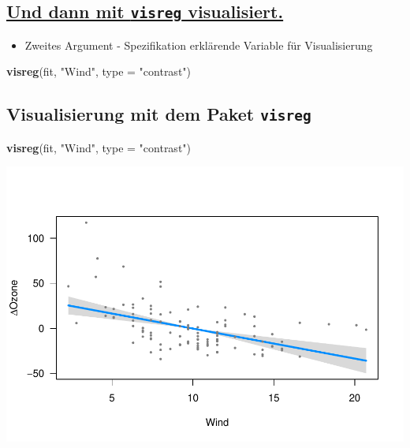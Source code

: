 \documentclass[]{article}
\newenvironment{Shaded}{\begin{snugshade}}{\end{snugshade}}
\newcommand{\KeywordTok}[1]{\textcolor[rgb]{0.13,0.29,0.53}{\textbf{{#1}}}}
\newcommand{\DataTypeTok}[1]{\textcolor[rgb]{0.13,0.29,0.53}{{#1}}}
\newcommand{\StringTok}[1]{\textcolor[rgb]{0.31,0.60,0.02}{{#1}}}
\newcommand{\NormalTok}[1]{{#1}}
\providecommand{\tightlist}{%
  \setlength{\itemsep}{0pt}\setlength{\parskip}{0pt}}
\begin{document}
\subsection{\texorpdfstring{\href{http://myweb.uiowa.edu/pbreheny/publications/visreg.pdf}{Und
dann mit \texttt{visreg}
visualisiert.}}{Und dann mit visreg visualisiert.}}\label{und-dann-mit-visreg-visualisiert.}

\begin{itemize}
\tightlist
\item
  Zweites Argument - Spezifikation erklärende Variable für
  Visualisierung
\end{itemize}

\begin{Shaded}
\begin{Highlighting}[]
\KeywordTok{visreg}\NormalTok{(fit, }\StringTok{"Wind"}\NormalTok{, }\DataTypeTok{type =} \StringTok{"contrast"}\NormalTok{)}
\end{Highlighting}
\end{Shaded}

\subsection{\texorpdfstring{Visualisierung mit dem Paket
\texttt{visreg}}{Visualisierung mit dem Paket visreg}}\label{visualisierung-mit-dem-paket-visreg}

\begin{Shaded}
\begin{Highlighting}[]
\KeywordTok{visreg}\NormalTok{(fit, }\StringTok{"Wind"}\NormalTok{, }\DataTypeTok{type =} \StringTok{"contrast"}\NormalTok{)}
\end{Highlighting}
\end{Shaded}

\includegraphics{Intro_Datenanalyse1_files/figure-latex/unnamed-chunk-280-1.pdf}
\end{document}
